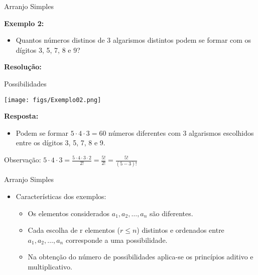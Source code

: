 \documentclass[aspectratio=169]{beamer}
\begin{document}
\begin{frame}{Arranjo Simples}

    \textbf{Exemplo 2:}
    
        \vspace{4mm}
        \begin{itemize}
            \item[] Quantos números distinos de 3 algarismos distintos podem se formar com os dígitos 3, 5, 7, 8 e 9?
        \end{itemize}
    
        \vspace{2mm}
    
       \textbf{Resolução:}
        
       \begin{multicols}{2}
           
        \begin{center}
            Possibilidades
        \end{center}
            
            
        \columnbreak

        
        \texttt{[image: figs/Exemplo02.png]}
            
           
       \end{multicols}
        
    
        \textbf{Resposta:}
    
        \begin{itemize}
            \item[] Podem se formar $5 \cdot 4 \cdot 3 = 60$ números diferentes com 3 algarismos escolhidos entre os dígitos 3, 5, 7, 8 e 9.
        \end{itemize}
    
        \vspace{2mm}

        Observação: $5 \cdot 4 \cdot 3 = \frac{5 \cdot 4 \cdot 3 \cdot 2}{2!} = \frac{5!}{2!} = \frac{5!}{(5 - 3)!}$
    \end{frame}

\begin{frame}{Arranjo Simples}
    \begin{itemize}
        \item Características dos exemplos:
        \begin{itemize}
            \item Os elementos considerados $a_1, a_2, \ldots, a_n$ são diferentes.
            \item Cada escolha de r elementos ($r \leq n$) distintos e ordenados entre $a_1, a_2, \ldots, a_n$ corresponde a uma possibilidade.
            \item Na obtenção do número de possibilidades aplica-se os princípios aditivo e multiplicativo.
        \end{itemize}
    \end{itemize}
\end{frame}
\end{document}
